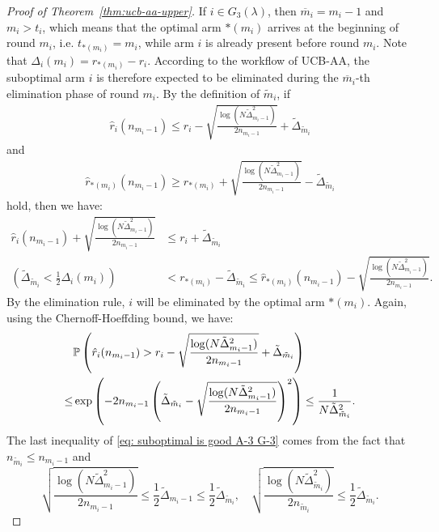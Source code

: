 \documentclass[
  12pt]{article}
\begin{document}
\begin{proof}[Proof of Theorem~\ref{thm:ucb-aa-upper}]
If $i\in G_3(\lambda)$, then $\overline{m}_i=m_i-1$ and $m_i>t_i$, which means that the optimal arm $*(m_i)$ arrives at the beginning of round $m_i$, i.e. $t_{*(m_i)}=m_i$, while arm $i$ is already present before round $m_i$. Note that $\Delta_i(m_i)=r_{*(m_i)}-r_i$. According to the workflow of UCB-AA, the suboptimal arm $i$ is therefore expected to be eliminated during the $\overline{m}_i$-th elimination phase of round $m_i$. By the definition of $\tilde{m}_i$, if
\begin{align}
    \hat{r}_i(n_{m_i-1}) \leq r_i - \sqrt{\frac{\log(N \tilde{\Delta}_{m_i-1}^2)}{2n_{m_i-1}}}+\tilde{\Delta}_{\tilde{m}_i} \label{eq: suboptimal is bad A-3 G-3}
\end{align}
and  
\begin{align}
    \hat{r}_{*(m_i)}(n_{m_i-1}) \geq r_{*(m_i)} + \sqrt{\frac{\log(N \tilde{\Delta}_{m_i-1}^2)}{2n_{m_i-1}}} -\tilde{\Delta}_{\tilde{m}_i}
    \label{eq: optimal is good A-3 G-3}
\end{align}
hold, then we have:  
\begin{align*}
    \hat{r}_i(n_{m_i-1}) + \sqrt{\frac{\log(N \tilde{\Delta}_{m_i-1}^2)}{2n_{m_i-1}}} &\leq r_i + \tilde{\Delta}_{\tilde{m}_i}\\
   \left(\tilde{\Delta}_{\tilde{m}_i}<\frac{1}{2}\Delta_i(m_i)\right) &< r_{*(m_i)} -\tilde{\Delta}_{\tilde{m}_i} \leq \hat{r}_{*(m_i)}(n_{m_i-1}) - \sqrt{\frac{\log(N \tilde{\Delta}_{m_i-1}^2)}{2n_{m_i-1}}}.
\end{align*}
By the elimination rule, \( i \) will be eliminated by the optimal arm $*(m_i)$. Again, using the Chernoff-Hoeffding bound, we have:
\begin{align}
   & \mathbb{P}\left( \hat{r}_i(n_{m_i-1})>r_i - \sqrt{\frac{\log(N \tilde{\Delta}_{m_i-1}^2)}{2n_{m_i-1}}}+\tilde{\Delta}_{\tilde{m}_i} \right) \notag\\   
   \leq &\exp\left(-2n_{m_i-1}\left(\tilde{\Delta}_{\tilde{m}_i} - \sqrt{\frac{\log(N \tilde{\Delta}_{m_i-1}^2)}{2n_{m_i-1}}}\right)^2\right)\leq \frac{1}{N\tilde{\Delta}_{\tilde{m}_i}^2}.
    \label{eq: suboptimal is good A-3 G-3}
\end{align}
The last inequality of \eqref{eq: suboptimal is good A-3 G-3} comes from the fact that $n_{\tilde{m}_i}\leq n_{m_i-1}$ and
\[\sqrt{\frac{\log(N \tilde{\Delta}_{m_i-1}^2)}{2n_{m_i-1}}}\leq \frac{1}{2}\tilde{\Delta}_{m_i-1}\leq \frac{1}{2}\tilde{\Delta}_{\tilde{m}_i},\quad \sqrt{\frac{\log(N \tilde{\Delta}_{\tilde{m}_i}^2)}{2n_{\tilde{m}_i}}}\leq \frac{1}{2}\tilde{\Delta}_{\tilde{m}_i}.\]


\end{proof}
\end{document}
